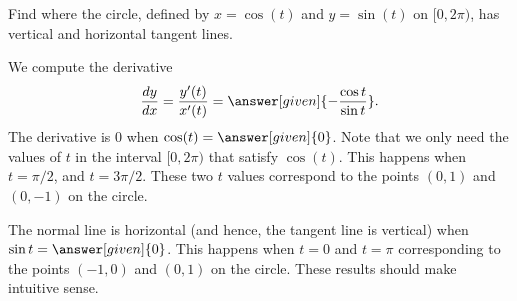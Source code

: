 \documentclass{ximera}
\begin{document}
\begin{example}
  Find where the circle, defined by $x=\cos( t)$ and $y=\sin( t)$ on
  $[0,2\pi)$, has vertical and horizontal tangent lines.
  \begin{explanation}
    We compute the derivative 
    \[
    \frac{dy}{dx} = \frac{y'(t)}{x'(t)} = \answer[given]{-\frac{\cos t}{\sin t}}.
    \]
    The derivative is $0$ when $\cos( t)= \answer[given]{0}$. Note that we only need the values of $t$ in the interval $[0, 2\pi)$ that satisfy $\cos(t)$. 
    This  happens when $t=\pi/2$, and $t= 3\pi/2$. These two $t$ values correspond to the points $(0,1)$ and $(0,-1)$ on the circle.

    The normal line is horizontal (and hence, the tangent line is
    vertical) when $\sin t=\answer[given]{0}$. This happens when $t=
    0$ and $t=\pi$ corresponding to the points $(-1,0)$ and
    $(0,1)$ on the circle. These results should make intuitive sense.
  \end{explanation}





\end{example}
\end{document}
